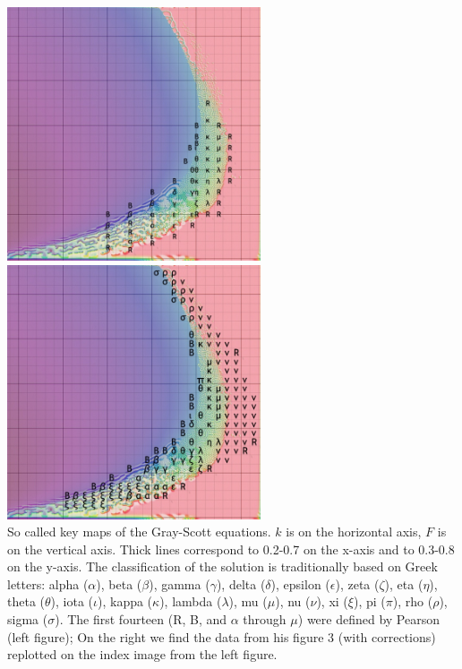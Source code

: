 \begin{center}
\includegraphics[height=7.5cm]{python_codes/fieldstone_171/images/pearson-orig}
\includegraphics[height=7.5cm]{python_codes/fieldstone_171/images/pearson-tags}\\
{\captionfont So called key maps of the Gray-Scott equations. $k$ is on the 
horizontal axis, $F$ is on the vertical axis. Thick lines correspond to 
0.2-0.7 on the x-axis and to 0.3-0.8 on the y-axis.
The classification of the solution is traditionally based on Greek letters:
alpha ($\alpha$),    beta ($\beta$),    gamma ($\gamma$),    delta ($\delta$),    
epsilon ($\epsilon$),    zeta ($\zeta$),    eta ($\eta$),    
theta ($\theta$),    iota ($\iota$),    kappa ($\kappa$),    lambda ($\lambda$),    
mu ($\mu$),    nu ($\nu$),    xi ($\xi$),    pi ($\pi$),    rho ($\rho$),    sigma ($\sigma$).
The first fourteen
(R, B, and $\alpha$ through $\mu$) were defined by Pearson \cite{pear93} (left figure); 
On the right we find the data from his figure 3 (with corrections) replotted on the index image from the left figure. 
}
\end{center}

